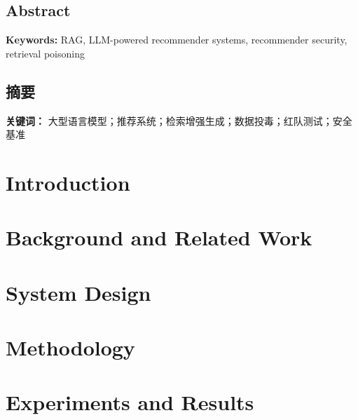 \documentclass[12pt]{article}
\date{}
\begin{document}
\thispagestyle{fancy}

\begin{center}
\section*{Abstract}
\end{center}



\noindent\textbf{Keywords: } RAG, LLM-powered recommender systems, recommender security, retrieval poisoning

\clearpage
\begin{center}
\section*{摘要}
\end{center}


\noindent\textbf{关键词：} 大型语言模型；推荐系统；检索增强生成；数据投毒；红队测试；安全基准
\clearpage
\tableofcontents
\clearpage

\section{Introduction}


\section{Background and Related Work}


\section{System Design}
\label{sec:system-design}


\section{Methodology}
\label{sec:methodology}


\section{Experiments and Results}

\end{document}
